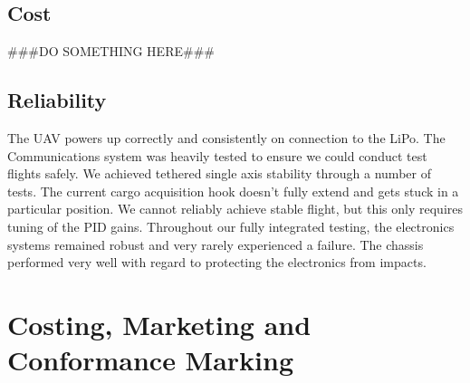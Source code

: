 \documentclass[a4paper,11pt]{article}
\begin{document}
\subsection{Cost}
\#\#\#DO SOMETHING HERE\#\#\#
\subsection{Reliability}
The UAV powers up correctly and consistently on connection to the LiPo.
The Communications system was heavily tested to ensure we could conduct test flights safely.
We achieved tethered single axis stability through a number of tests.
The current cargo acquisition hook doesn't fully extend and gets stuck in a particular position.
We cannot reliably achieve stable flight, but this only requires tuning of the PID gains.
Throughout our fully integrated testing, the electronics systems remained robust and very rarely experienced a failure.
The chassis performed very well with regard to protecting the electronics from impacts.

\section{Costing, Marketing and Conformance Marking}
\end{document}
